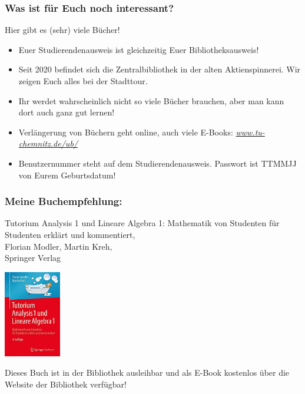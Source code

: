 \documentclass[10pt]{beamer}
\begin{document}
\begin{frame}
	\frametitle{Was ist für Euch noch interessant?}

	\begin{block}{\vphantom{X}}
		Hier gibt es (sehr) viele Bücher!
	\end{block}

	\begin{itemize}
		\item Euer Studierendenausweis ist gleichzeitig Euer Bibliotheksausweis!
		\item Seit 2020 befindet sich die Zentralbibliothek in der alten Aktienspinnerei. Wir zeigen Euch alles bei der Stadttour.
		\item Ihr werdet wahrscheinlich nicht so viele Bücher brauchen, aber man kann dort auch ganz gut lernen!
		\item Verlängerung von Büchern geht online, auch viele E-Books: \textit{\href{https://www.tu-chemnitz.de/ub/}{www.tu-chemnitz.de/ub/}}
		\item Benutzernummer steht auf dem Studierendenausweis. Passwort ist TTMMJJ von Eurem Geburtsdatum!
	\end{itemize}
\end{frame}

\begin{frame}
	\frametitle{Meine Buchempfehlung:}

	Tutorium Analysis 1 und Lineare Algebra 1: Mathematik von Studenten für Studenten erklärt und kommentiert, \\
	Florian Modler, Martin Kreh, \\
	Springer Verlag 

	\begin{center}
		\includegraphics[width=2.5cm]{bilder/Buch.jpg}
	\end{center}

	Dieses Buch ist in der Bibliothek ausleihbar und als E-Book kostenlos über die Website der Bibliothek verfügbar!
\end{frame}
\end{document}
